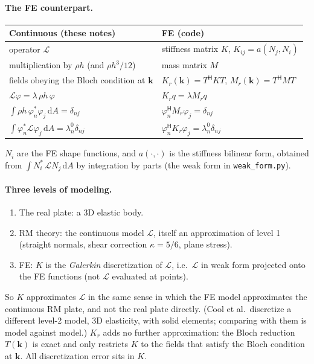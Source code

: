 \paragraph{The FE counterpart.}
\begin{center}
\begin{tabular}{|l|p{}|}
\hline
Continuous (these notes) & FE (code) \\
\hline
operator $\mathcal{L}$ & stiffness matrix $K$, $K_{ij} = a(N_j, N_i)$ \\
multiplication by $\rho h$ (and $\rho h^3/12$) & mass matrix $M$ \\
fields obeying the Bloch condition at $\mathbf{k}$ & $K_r(\mathbf{k}) = T^\mathsf{H} K T$, $M_r(\mathbf{k}) = T^\mathsf{H} M T$ \\
$\mathcal{L}\varphi = \lambda\, \rho h\, \varphi$ & $K_r q = \lambda M_r q$ \\
$\int \rho h\, \varphi_n^* \varphi_j\,\mathrm{d}A = \delta_{nj}$ & $\varphi_n^\mathsf{H} M_r \varphi_j = \delta_{nj}$ \\
$\int \varphi_n^* \mathcal{L}\varphi_j\,\mathrm{d}A = \lambda_n^0 \delta_{nj}$ & $\varphi_n^\mathsf{H} K_r \varphi_j = \lambda_n^0 \delta_{nj}$ \\
\hline
\end{tabular}
\end{center}
$N_i$ are the FE shape functions, and $a(\cdot,\cdot)$ is the stiffness bilinear
form, obtained from $\int N_i^*\, \mathcal{L} N_j\,\mathrm{d}A$ by integration by
parts (the weak form in \texttt{weak\_form.py}).

\paragraph{Three levels of modeling.}
\begin{enumerate}
  \item The real plate: a 3D elastic body.
  \item RM theory: the continuous model $\mathcal{L}$, itself an approximation
        of level 1 (straight normals, shear correction $\kappa = 5/6$, plane
        stress).
  \item FE: $K$ is the \emph{Galerkin} discretization of $\mathcal{L}$, i.e.\
        $\mathcal{L}$ in weak form projected onto the FE functions (not
        $\mathcal{L}$ evaluated at points).
\end{enumerate}
So $K$ approximates $\mathcal{L}$ in the same sense in which the FE model
approximates the continuous RM plate, and not the real plate directly. (Cool
et al.\ discretize a different level-2 model, 3D elasticity, with solid
elements; comparing with them is model against model.) $K_r$ adds no further
approximation: the Bloch reduction $T(\mathbf{k})$ is exact and only restricts
$K$ to the fields that satisfy the Bloch condition at $\mathbf{k}$. All
discretization error sits in $K$.

